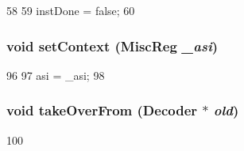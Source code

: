 \begin{DoxyCode}
58     {
59         instDone = false;
60     }
\end{DoxyCode}
\hypertarget{classSparcISA_1_1Decoder_a65c69bb25bb272d1f2dc6556abc47677}{
\subsubsection[{setContext}]{\setlength{\rightskip}{0pt plus 5cm}void setContext ({\bf MiscReg} {\em \_\-asi})}}
\label{classSparcISA_1_1Decoder_a65c69bb25bb272d1f2dc6556abc47677}



\begin{DoxyCode}
96     {
97         asi = _asi;
98     }
\end{DoxyCode}
\hypertarget{classSparcISA_1_1Decoder_a83393f90e7cbd98eda9721ba6022d0e0}{
\subsubsection[{takeOverFrom}]{\setlength{\rightskip}{0pt plus 5cm}void takeOverFrom ({\bf Decoder} $\ast$ {\em old})}}
\label{classSparcISA_1_1Decoder_a83393f90e7cbd98eda9721ba6022d0e0}



\begin{DoxyCode}
100 {}
\end{DoxyCode}


